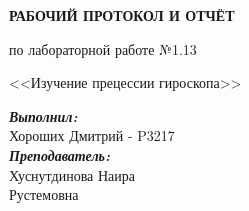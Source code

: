 \documentclass[12pt, a4paper]{article}
\begin{document}

\vspace*{0.25\textheight}
\begin{center}
\textbf{\LARGE РАБОЧИЙ ПРОТОКОЛ И ОТЧЁТ }

\LARGE по лабораторной работе №1.13

\LARGE <<Изучение прецессии гироскопа>>

\end{center}
\vspace*{5cm}
\begin{flushright}
\begin{minipage}{.33\linewidth}
\textit{\textbf{Выполнил:}}\\
Хороших Дмитрий - P3217\\
\textit{\textbf{Преподаватель:}}\\
Хуснутдинова Наира\\ Рустемовна
\end{minipage}
\end{flushright}


\thispagestyle{firstpage}
\newpage
\tableofcontents

\restoregeometry
\end{document}
